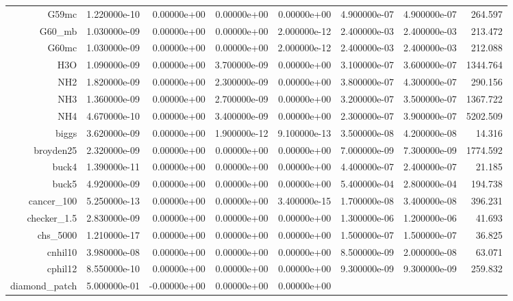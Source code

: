 {{\begin{table}[h]
\begin{center}
{\begin{tabular}{r|r|r|r|r|r|r|r}
      G59mc & 1.220000e-10 & 0.00000e+00 & 0.00000e+00 & 0.00000e+00 &
      4.900000e-07 & 4.900000e-07 & 264.597\\
      G60\_mb & 1.030000e-09 & 0.00000e+00 & 0.00000e+00 & 2.000000e-12 &
      2.400000e-03 & 2.400000e-03 & 213.472\\
      G60mc & 1.030000e-09 & 0.00000e+00 & 0.00000e+00 & 2.000000e-12 &
      2.400000e-03 & 2.400000e-03 & 212.088\\
      H3O & 1.090000e-09 & 0.00000e+00 & 3.700000e-09 & 0.00000e+00 &
      3.100000e-07 & 3.600000e-07 & 1344.764\\
      NH2 & 1.820000e-09 & 0.00000e+00 & 2.300000e-09 & 0.00000e+00 &
      3.800000e-07 & 4.300000e-07 & 290.156\\
      NH3 & 1.360000e-09 & 0.00000e+00 & 2.700000e-09 & 0.00000e+00 &
      3.200000e-07 & 3.500000e-07 & 1367.722\\
      NH4 & 4.670000e-10 & 0.00000e+00 & 3.400000e-09 & 0.00000e+00 &
      2.300000e-07 & 3.900000e-07 & 5202.509\\
      biggs & 3.620000e-09 & 0.00000e+00 & 1.900000e-12 & 9.100000e-13 &
      3.500000e-08 & 4.200000e-08 & 14.316\\
      broyden25 & 2.320000e-09 & 0.00000e+00 & 0.00000e+00 & 0.00000e+00 &
      7.000000e-09 & 7.300000e-09 & 1774.592\\
      buck4 & 1.390000e-11 & 0.00000e+00 & 0.00000e+00 & 0.00000e+00 &
      4.400000e-07 & 2.400000e-07 & 21.185\\
      buck5 & 4.920000e-09 & 0.00000e+00 & 0.00000e+00 & 0.00000e+00 &
      5.400000e-04 & 2.800000e-04 & 194.738\\
      cancer\_100 & 5.250000e-13 & 0.00000e+00 & 0.00000e+00 & 3.400000e-15 &
      1.700000e-08 & 3.400000e-08 & 396.231\\
      checker\_1.5 & 2.830000e-09 & 0.00000e+00 & 0.00000e+00 & 0.00000e+00 &
      1.300000e-06 & 1.200000e-06 & 41.693\\
      chs\_5000 & 1.210000e-17 & 0.00000e+00 & 0.00000e+00 & 0.00000e+00 &
      1.500000e-07 & 1.500000e-07 & 36.825\\
      cnhil10 & 3.980000e-08 & 0.00000e+00 & 0.00000e+00 & 0.00000e+00 &
      8.500000e-09 & 2.000000e-08 & 63.071\\
      cphil12 & 8.550000e-10 & 0.00000e+00 & 0.00000e+00 & 0.00000e+00 &
      9.300000e-09 & 9.300000e-09 & 259.832\\
      diamond\_patch & 5.000000e-01 & -0.00000e+00 & 0.00000e+00 & 0.00000e+00

\end{tabular}}
\end{center}
\end{table}}}
